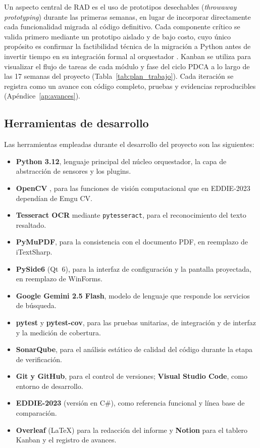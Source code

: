 Un aspecto central de RAD es el uso de prototipos desechables (\textit{throwaway prototyping}) durante las primeras semanas, en lugar de incorporar directamente cada funcionalidad migrada al código definitivo. Cada componente crítico se valida primero mediante un prototipo aislado y de bajo costo, cuyo único propósito es confirmar la factibilidad técnica de la migración a Python antes de invertir tiempo en su integración formal al orquestador \citep{figueroa2025}. Kanban se utiliza para visualizar el flujo de tareas de cada módulo y fase del ciclo PDCA a lo largo de las 17 semanas del proyecto (Tabla~\ref{tab:plan_trabajo}). Cada iteración se registra como un avance con código completo, pruebas y evidencias reproducibles (Apéndice~\ref{ap:avances}).

\subsection{Herramientas de desarrollo}

Las herramientas empleadas durante el desarrollo del proyecto son las siguientes:

\begin{itemize}
  \item \textbf{Python 3.12}, lenguaje principal del núcleo orquestador, la capa de abstracción de sensores y los plugins.
  \item \textbf{OpenCV} \citep{bradski2000}, para las funciones de visión computacional que en EDDIE-2023 dependían de Emgu CV.
  \item \textbf{Tesseract OCR} \citep{smith2007} mediante \texttt{pytesseract}, para el reconocimiento del texto resaltado.
  \item \textbf{PyMuPDF}, para la consistencia con el documento PDF, en reemplazo de iTextSharp.
  \item \textbf{PySide6} (Qt~6), para la interfaz de configuración y la pantalla proyectada, en reemplazo de WinForms.
  \item \textbf{Google Gemini 2.5 Flash}, modelo de lenguaje que responde los servicios de búsqueda.
  \item \textbf{pytest} y \textbf{pytest-cov}, para las pruebas unitarias, de integración y de interfaz y la medición de cobertura.
  \item \textbf{SonarQube}, para el análisis estático de calidad del código durante la etapa de verificación.
  \item \textbf{Git y GitHub}, para el control de versiones; \textbf{Visual Studio Code}, como entorno de desarrollo.
  \item \textbf{EDDIE-2023} (versión en C\#), como referencia funcional y línea base de comparación.
  \item \textbf{Overleaf} (\LaTeX) para la redacción del informe y \textbf{Notion} para el tablero Kanban y el registro de avances.
\end{itemize}

